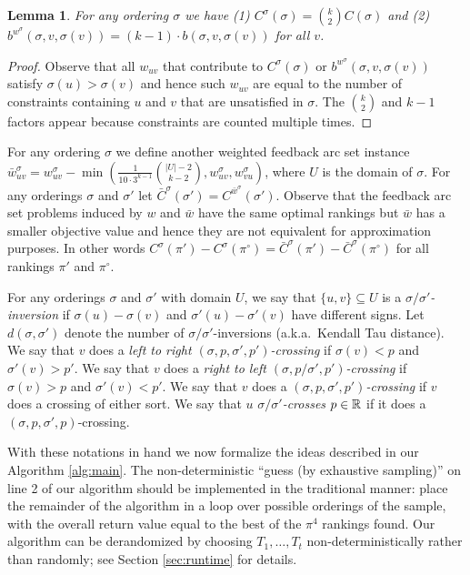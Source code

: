 \documentclass[dvips,11pt,letter]{article}
\newcommand{\set}[1]{\{#1\}}                        \newcommand{\setof}[2]{\{\,{#1}\::\:{#2}\,\}}        \newcommand{\groupFrac}[2]{\left(\frac{#1}{#2}\right)}
\newtheorem{lemma}[theorem]{Lemma}
\begin{document}
\begin{lemma}\label{lem:objEq}
For any ordering $\sigma$ we have (1) $C^\sigma(\sigma) = \binom{k}{2}C(\sigma)$ and (2) $b^{w^\sigma}(\sigma, v, \sigma(v)) = (k-1) \cdot b(\sigma, v, \sigma(v))$ for all $v$.
\end{lemma}

\begin{proof}
Observe that all $w_{uv}$ that contribute to $C^\sigma(\sigma) $ or $b^{w^\sigma}(\sigma, v, \sigma(v))$ satisfy $\sigma(u)>\sigma(v)$ and hence such $w_{uv}$ are equal to the number of constraints containing $u$ and $v$ that are unsatisfied in $\sigma$. The $\binom{k}{2}$ and $k-1$ factors appear because constraints are counted multiple times.
\end{proof}

For any ordering $\sigma$ we define another weighted feedback arc set instance \\
$\bar w_{uv}^{\sigma} = w_{uv}^\sigma - \min(\frac{1}{10 \cdot 3^{k-1}} \binom{|U|-2}{k-2}, w_{uv}^\sigma, w_{vu}^\sigma)$,
 where $U$ is the domain of $\sigma$. For any orderings $\sigma$ and $\sigma'$ let $\bar C^\sigma(\sigma') = C^{\bar w^\sigma}(\sigma')$. Observe that the feedback arc set problems induced by $w$ and $\bar w$ have the same optimal rankings but $\bar w$ has a smaller objective value and hence they are not equivalent for approximation purposes. In other words $C^\sigma(\pi') - C^\sigma(\pi^\circ) = \bar C^\sigma(\pi') - \bar C^\sigma(\pi^\circ)$ for all rankings $\pi'$ and $\pi^\circ$.

For any orderings $\sigma$ and $\sigma'$ with domain $U$, we say that $\set{u,v} \subseteq U$ is a \emph{$\sigma/\sigma'$-inversion} if $\sigma(u) - \sigma(v)$ and $\sigma'(u)-\sigma'(v)$ have different signs. Let $d(\sigma,\sigma')$ denote the number of $\sigma/\sigma'$-inversions (a.k.a.\ Kendall Tau distance).
We say that $v$ does a \emph{left to right $(\sigma,p,\sigma',p')$-crossing} if $\sigma(v) < p$ and $\sigma'(v) >p'$. 
We say that $v$ does a \emph{right to left $(\sigma,p/\sigma',p')$-crossing} if $\sigma(v) > p$ and $\sigma'(v) < p'$. We say that $v$ does a \emph{$(\sigma,p,\sigma',p')$-crossing} if $v$ does a crossing of either sort.
We say that $u$ \emph{$\sigma/\sigma'$-crosses} $p \in \mathbb{R}$ if it does a $(\sigma,p,\sigma',p)$-crossing.

With these notations in hand we now formalize the ideas described in our Algorithm \ref{alg:main}. The non-deterministic ``guess (by exhaustive sampling)'' on line 2 of our algorithm should be implemented in the traditional manner: place the remainder of the algorithm in a loop over possible orderings of the sample, with the overall return value equal to the best of the $\pi^4$ rankings found. Our algorithm can be derandomized by choosing  $T_1,\ldots,T_t$ non-deterministically rather than randomly; see Section \ref{sec:runtime} for details.
\end{document}
